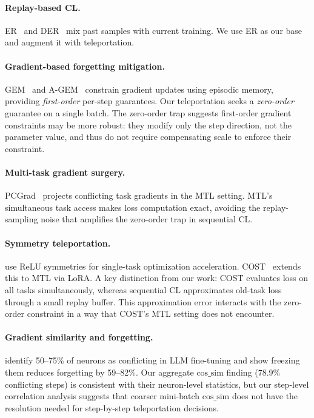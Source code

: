 \documentclass{article}
\newcommand{\cossim}{\mathrm{cos\_sim}}
\begin{document}
\paragraph{Replay-based CL.}
ER~\citep{rolnick2019er} and DER~\citep{buzzega2020der} mix past samples with current training.
We use ER as our base and augment it with teleportation.

\paragraph{Gradient-based forgetting mitigation.}
GEM~\citep{lopezpaz2017gem} and A-GEM~\citep{chaudhry2019agem} constrain gradient updates
using episodic memory, providing \emph{first-order} per-step guarantees.
Our teleportation seeks a \emph{zero-order} guarantee on a single batch.
The zero-order trap suggests first-order gradient constraints may be more robust:
they modify only the step direction, not the parameter value, and thus do not require
compensating scale to enforce their constraint.

\paragraph{Multi-task gradient surgery.}
PCGrad~\citep{yu2020pcgrad} projects conflicting task gradients in the MTL setting.
MTL's simultaneous task access makes loss computation exact, avoiding the replay-sampling
noise that amplifies the zero-order trap in sequential CL.

\paragraph{Symmetry teleportation.}
\citet{zhao2022teleport} use ReLU symmetries for single-task optimization acceleration.
COST~\citep{zhou2025cost} extends this to MTL via LoRA.
A key distinction from our work: COST evaluates loss on all tasks simultaneously,
whereas sequential CL approximates old-task loss through a small replay buffer.
This approximation error interacts with the zero-order constraint in a way
that COST's MTL setting does not encounter.

\paragraph{Gradient similarity and forgetting.}
\citet{liu2026gradconflict} identify 50--75\% of neurons as conflicting in LLM fine-tuning
and show freezing them reduces forgetting by 59--82\%.
Our aggregate $\cossim$ finding (78.9\% conflicting steps) is consistent with their
neuron-level statistics, but our step-level correlation analysis suggests that coarser
mini-batch $\cossim$ does not have the resolution needed for step-by-step teleportation decisions.
\end{document}
